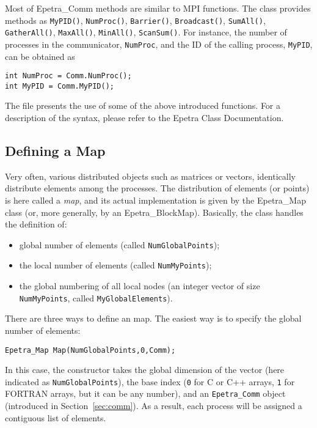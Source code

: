 Most of Epetra\_Comm methods are similar to MPI functions. The class
provides methods as \verb!MyPID()!, \verb!NumProc()!, \verb!Barrier()!,
\verb!Broadcast()!, \verb!SumAll()!, \verb!GatherAll()!,
\verb!MaxAll()!, \verb!MinAll()!, \verb!ScanSum()!.  For instance, the
number of processes in the communicator, \verb!NumProc!, and the ID of
the calling process, \verb!MyPID!, can be obtained as
\begin{verbatim}
int NumProc = Comm.NumProc();
int MyPID = Comm.MyPID();
\end{verbatim}

The file  presents the use of some of the above
introduced functions.  For a description of the syntax, please refer to
the Epetra Class Documentation.


\subsection{Defining a Map}
\label{sec:map}

Very often, various distributed objects such as matrices or vectors,
identically distribute elements among the processes.  The distribution
of elements (or points) is here called a {\sl map}, and its actual
implementation is given by the Epetra\_Map class (or, more generally, by
an Epetra\_BlockMap).  Basically, the class handles the definition of:
\begin{itemize}
\item global number of elements (called \verb!NumGlobalPoints!);
\item the local number of elements (called \verb!NumMyPoints!);
\item the global numbering of all local nodes (an integer vector of size
  \verb!NumMyPoints!, called \verb!MyGlobalElements!).
\end{itemize}

There are  three ways to define an map. The easiest way is to
specify the global number of elements:
\begin{verbatim}
Epetra_Map Map(NumGlobalPoints,0,Comm);
\end{verbatim}
In this case, the constructor takes the global dimension of the vector
(here indicated as \verb!NumGlobalPoints!), the base index (\verb!0! for
C or C++ arrays, \verb!1! for FORTRAN arrays, but it can be any number),
and an \verb!Epetra_Comm!  object (introduced in
Section~\ref{sec:comm}). As a result, each process will be assigned a
contiguous list of elements.

